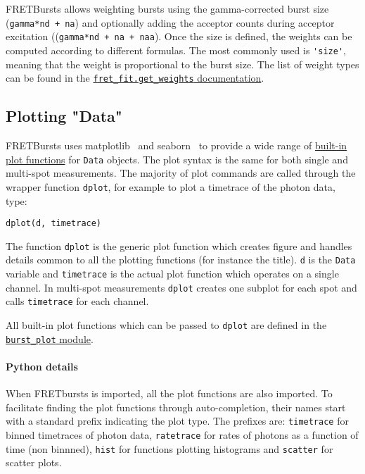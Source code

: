 FRETBursts allows weighting bursts using the gamma-corrected burst size
(\verb|gamma*nd + na|) and optionally adding the acceptor counts during
acceptor excitation ((\verb|gamma*nd + na + naa|). Once the size is defined, the weights
can be computed according to different formulas. The most
commonly used is \verb|'size'|, meaning that the weight
is proportional to the burst size. The list of weight types
can be found in the
\href{http://fretbursts.readthedocs.org/en/latest/fret_fit.html#fretbursts.fret_fit.get_weights}{\texttt{fret\_fit.get\_weights} documentation}.

\subsection{Plotting "Data"}
\label{sec:plotting}

FRETBursts uses 
matplotlib~\cite{matplotlib}
and seaborn~\cite{seaborn} 
to provide a wide range of
\href{http://fretbursts.readthedocs.org/en/latest/plots.html}{built-in plot functions}
for \verb|Data| objects.
The plot syntax is the same for both single and multi-spot measurements.
The majority of plot commands are called through the wrapper function
\verb|dplot|, for example to plot a timetrace of the photon data, type:

\begin{verbatim}
dplot(d, timetrace)
\end{verbatim}

The function \verb|dplot| is the generic plot function which creates figure
and handles details common to all the plotting functions (for instance the title).
\verb|d| is the \verb|Data| variable and \verb|timetrace| is the actual plot
function which operates on a single channel. In multi-spot measurements
\verb|dplot| creates one subplot for each spot and calls \verb|timetrace| for
each channel.

All built-in plot functions which can be passed to
\verb|dplot| are defined in the
\href{http://fretbursts.readthedocs.org/en/latest/plots.html}{\texttt{burst\_plot} module}.

\paragraph{Python details}

When FRETbursts is imported, all the plot functions are also imported.
To facilitate finding the plot functions through auto-completion,
their names start with a standard prefix indicating the
plot type. The prefixes are: \verb|timetrace| for binned timetraces
of photon data, \verb|ratetrace| for rates of photons as a function of time (non
binnned), \verb|hist| for functions plotting histograms and \verb|scatter| for
scatter plots.

